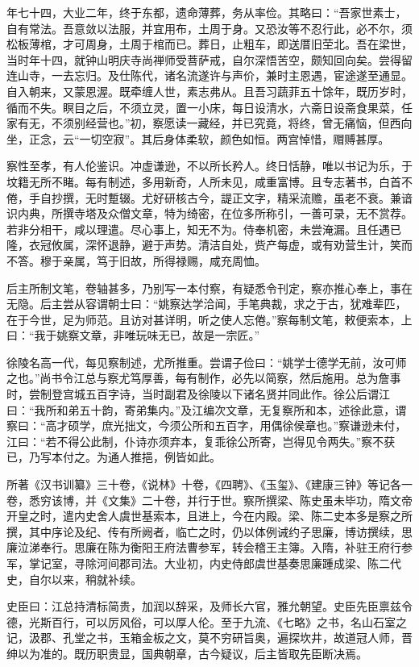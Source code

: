 \documentclass[]{article}
\begin{document}
年七十四，大业二年，终于东都，遗命薄葬，务从率俭。其略曰：``吾家世素士，自有常法。吾意敛以法服，并宜用布，土周于身。又恐汝等不忍行此，必不尔，须松板薄棺，才可周身，土周于棺而已。葬日，止粗车，即送厝旧茔北。吾在梁世，当时年十四，就钟山明庆寺尚禅师受菩萨戒，自尔深悟苦空，颇知回向矣。尝得留连山寺，一去忘归。及仕陈代，诸名流遂许与声价，兼时主恩遇，宦途遂至通显。自入朝来，又蒙恩渥。既牵缠人世，素志弗从。且吾习蔬菲五十馀年，既历岁时，循而不失。瞑目之后，不须立灵，置一小床，每日设清水，六斋日设斋食果菜，任家有无，不须别经营也。''初，察愿读一藏经，并已究竟，将终，曾无痛恼，但西向坐，正念，云``一切空寂''。其后身体柔软，颜色如恒。两宫悼惜，赗赙甚厚。

察性至孝，有人伦鉴识。冲虚谦逊，不以所长矜人。终日恬静，唯以书记为乐，于坟籍无所不睹。每有制述，多用新奇，人所未见，咸重富博。且专志著书，白首不倦，手自抄撰，无时蹔辍。尤好研核古今，諟正文字，精采流赡，虽老不衰。兼谙识内典，所撰寺塔及众僧文章，特为绮密，在位多所称引，一善可录，无不赏荐。若非分相干，咸以理遣。尽心事上，知无不为。侍奉机密，未尝淹漏。且任遇已隆，衣冠攸属，深怀退静，避于声势。清洁自处，赀产每虚，或有劝营生计，笑而不答。穆于亲属，笃于旧故，所得禄赐，咸充周恤。

后主所制文笔，卷轴甚多，乃别写一本付察，有疑悉令刊定，察亦推心奉上，事在无隐。后主尝从容谓朝士曰：``姚察达学洽闻，手笔典裁，求之于古，犹难辈匹，在于今世，足为师范。且访对甚详明，听之使人忘倦。''察每制文笔，敕便索本，上曰：``我于姚察文章，非唯玩味无已，故是一宗匠。''

徐陵名高一代，每见察制述，尤所推重。尝谓子俭曰：``姚学士德学无前，汝可师之也。''尚书令江总与察尤笃厚善，每有制作，必先以简察，然后施用。总为詹事时，尝制登宫城五百字诗，当时副君及徐陵以下诸名贤并同此作。徐公后谓江曰：``我所和弟五十韵，寄弟集内。''及江编次文章，无复察所和本，述徐此意，谓察曰：``高才硕学，庶光拙文，今须公所和五百字，用偶徐侯章也。''察谦逊未付，江曰：``若不得公此制，仆诗亦须弃本，复乖徐公所寄，岂得见令两失。''察不获已，乃写本付之。为通人推挹，例皆如此。

所著《汉书训纂》三十卷，《说林》十卷，《四聘》、《玉玺》、《建康三钟》等记各一卷，悉穷该博，并《文集》二十卷，并行于世。察所撰梁、陈史虽未毕功，隋文帝开皇之时，遣内史舍人虞世基索本，且进上，今在内殿。梁、陈二史本多是察之所撰，其中序论及纪、传有所阙者，临亡之时，仍以体例诫约子思廉，博访撰续，思廉泣涕奉行。思廉在陈为衡阳王府法曹参军，转会稽王主簿。入隋，补驻王府行参军，掌记室，寻除河间郡司法。大业初，内史侍郎虞世基奏思廉踵成梁、陈二代史，自尔以来，稍就补续。

史臣曰：江总持清标简贵，加润以辞采，及师长六官，雅允朝望。史臣先臣禀兹令德，光斯百行，可以厉风俗，可以厚人伦。至于九流、《七略》之书，名山石室之记，汲郡、孔堂之书，玉箱金板之文，莫不穷研旨奥，遍探坎井，故道冠人师，晋绅以为准的。既历职贵显，国典朝章，古今疑议，后主皆取先臣断决焉。
\end{document}
